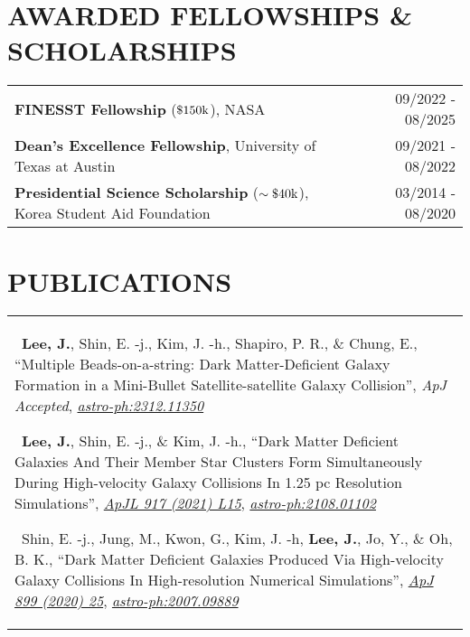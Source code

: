 \documentclass[letterpaper,10pt]{article}
\newcommand{\tabitem}{{\textbullet}~}
\begin{document}
\vspace{-15pt}


\section{\textbf{AWARDED FELLOWSHIPS \& SCHOLARSHIPS}}
\begin{center}
\begin{tabular*}{0.97\textwidth}{l@{\extracolsep{\fill}}r}
  \textbf{FINESST Fellowship} (\boldmath$\$150{\rm k}$), NASA &
  09/2022 - 08/2025\\
  \textbf{Dean’s Excellence Fellowship}, University of Texas at Austin &
  09/2021 - 08/2022\\
  \textbf{Presidential Science Scholarship} (\boldmath$\sim \$40{\rm k}$), Korea Student Aid Foundation & 
  03/2014 - 08/2020\\
\end{tabular*}
\end{center}



\newpage

\section{\textbf{PUBLICATIONS}}
\begin{center}
\begin{tabularx}{0.97\textwidth}{X}
\tabitem {\small \textbf{Lee, J.}, Shin, E. -j., Kim, J. -h., Shapiro, P. R., \& Chung, E.,
  ``Multiple Beads-on-a-string: Dark Matter-Deficient Galaxy Formation in a Mini-Bullet Satellite-satellite Galaxy Collision'',
  {\textit{ApJ Accepted}}, 
  \href{https://arxiv.org/abs/2312.11350}{\textit{astro-ph:2312.11350}}}

\tabitem {\small \textbf{Lee, J.}, Shin, E. -j., \& Kim, J. -h., 
  ``Dark Matter Deficient Galaxies And Their Member Star Clusters Form Simultaneously During High-velocity Galaxy Collisions In 1.25 pc Resolution Simulations'',
  \href{https://iopscience.iop.org/article/10.3847/2041-8213/ac16e0}{\textit{ApJL 917 (2021) L15}}, 
  \href{https://arxiv.org/abs/2108.01102}{\textit{astro-ph:2108.01102}}}
  
\tabitem {\small Shin, E. -j., Jung, M., Kwon, G., Kim, J. -h, \textbf{Lee, J.}, Jo, Y., \& Oh, B. K.,
  ``Dark Matter Deficient Galaxies Produced Via High-velocity Galaxy Collisions In High-resolution Numerical Simulations'',
  \href{https://iopscience.iop.org/article/10.3847/1538-4357/aba434/meta}{\textit{ApJ 899 (2020) 25}},
  \href{https://arxiv.org/abs/2007.09889}{\textit{astro-ph:2007.09889}}}
\end{tabularx}
\end{center}
\end{document}
